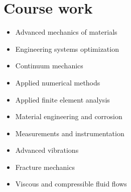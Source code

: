 \documentclass[10pt]{article} %
\begin{document}



\section{Course work}



\setlength{} %

\begin{paracol}{2} %

	\begin{itemize}\itemsep0em 
		\item Advanced mechanics of materials
		\item Engineering systems optimization
		\item Continuum mechanics
		\item Applied numerical methods
		\item Applied finite element analysis
	\end{itemize}
		
	
	\switchcolumn %
	

	\begin{itemize}\itemsep0em 
		\item Material engineering and corrosion
		\item Measurements and instrumentation
		\item Advanced vibrations
		\item Fracture mechanics	
		\item Viscous and compressible fluid flows
	\end{itemize}

	
\end{paracol}
\end{document}
